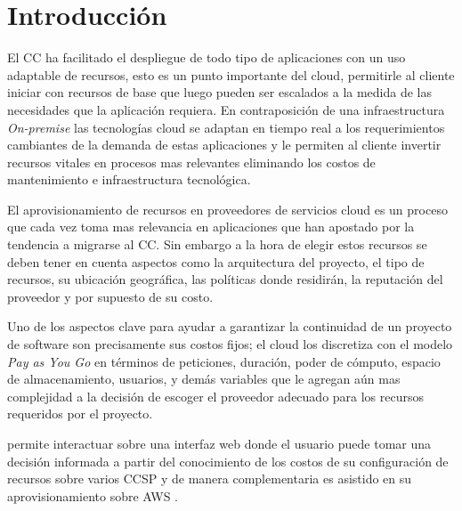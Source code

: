 \chapter{Introducción} %

\label{ch:introduccion} %



El \acrlong{CC} ha facilitado el despliegue de todo tipo de aplicaciones con un uso adaptable de recursos, esto es un punto importante del cloud, permitirle al cliente iniciar con recursos de base que luego pueden ser escalados a la medida de las necesidades que la aplicación requiera. En contraposición de una infraestructura \emph{On-premise} las tecnologías cloud se adaptan en tiempo real a los requerimientos cambiantes de la demanda de estas aplicaciones y le permiten al cliente invertir recursos vitales en procesos mas relevantes eliminando los costos de mantenimiento e infraestructura tecnológica.\bigskip

El aprovisionamiento de recursos en proveedores de servicios cloud es un proceso que cada vez toma mas relevancia en aplicaciones que han apostado por la tendencia a migrarse al \acrshort{CC}. Sin embargo a la hora de elegir estos recursos se deben tener en cuenta aspectos como la arquitectura del proyecto, el tipo de recursos, su ubicación geográfica, las políticas donde residirán, la reputación del proveedor y por supuesto de su costo.\bigskip

Uno de los aspectos clave para ayudar a garantizar la continuidad de un proyecto de software son precisamente sus costos fijos; el cloud los discretiza con el modelo \emph{Pay as You Go} en términos de peticiones, duración, poder de cómputo, espacio de almacenamiento, usuarios, y demás variables que le agregan aún mas complejidad a la decisión de escoger el proveedor adecuado para los recursos requeridos por el proyecto. \bigskip

\appName permite interactuar sobre una interfaz web donde el usuario puede tomar una decisión informada a partir del conocimiento de los costos de su configuración de recursos sobre varios \acrshort{CCSP} y de manera complementaria es asistido en su aprovisionamiento sobre \acrshort{AWS} .\bigskip
